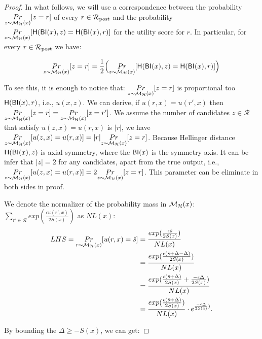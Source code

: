 \documentclass[sigconf]{acmart}
\begin{document}
\begin{proof}

In what follows, we will use a correspondence between the probability
 $\underset{z \thicksim \mathcal{M}_{\mathcal{H}}(x)}{Pr}[z = r]$ of every
 $r\in\mathcal{R}_{\textup{post}}$ and the probability 
 $\underset{z \thicksim \mathcal{M}_{\mathcal{H}}(x)}{Pr}[\mathsf{H}(\mathsf{BI}(x),z) =
 \mathsf{H}(\mathsf{BI}(x),r)]$ for the utility score for $r$. In particular, for every
 $r\in\mathcal{R}_{\textup{post}}$ we have:

$$
\underset{z \thicksim \mathcal{M}_{\mathcal{H}}(x)}{Pr}[z = r]=
\frac{1}{2}\Big (\underset{z \thicksim \mathcal{M}_{\mathcal{H}}(x)}{Pr}[\mathsf{H}(\mathsf{BI}(x),z) =
 \mathsf{H}(\mathsf{BI}(x),r)]\Big )
$$

To see this, it is enough to notice that: $\underset{z \thicksim \mathcal{M}_{\mathcal{H}}(x)}{Pr}[z = r]$ is proportional too $\mathsf{H}(\mathsf{BI}(x),r)$, i.e., $u(x,z)$. We can derive, if $u(r,x) = u(r',x)$ then $\underset{z \thicksim \mathcal{M}_{\mathcal{H}}(x)}{Pr}[z = r] = \underset{z \thicksim \mathcal{M}_{\mathcal{H}}(x)}{Pr}[z = r']$. We assume the number of candidates $z \in \mathcal{R}$ that satisfy $u(z,x) = u(r,x)$ is $|r|$, we have  $\underset{z \thicksim \mathcal{M}_{\mathcal{H}}(x)}{Pr}[u(z,x) = u(r,x)] = |r| \underset{z \thicksim \mathcal{M}_{\mathcal{H}}(x)}{Pr}[z = r]$. Because Hellinger distance  $\mathsf{H}(\mathsf{BI}(x),z)$ is axial symmetry, where the $\mathsf{BI}(x)$ is the symmetry axis. It can be infer that $|z| = 2$ for any candidates, apart from the true output, i.e., $\underset{z \thicksim \mathcal{M}_{\mathcal{H}}(x)}{Pr}[u(z,x) = u(r,x)] = 2 \underset{z \thicksim \mathcal{M}_{\mathcal{H}}(x)}{Pr}[z = r]$. This parameter can be eliminate in both sides in proof.

We denote the normalizer of the probability mass in $\mathcal{M}_{\mathcal{H}}(x)$: $\sum_{r' \in \mathcal{R}}exp(\frac{\epsilon u(r',x)}{2 S(x)})$ as $NL(x)$:
\begin{equation*}
\begin{split}
LHS 
  = \underset{r \thicksim \mathcal{M}_{\mathcal{H}}(x)}{Pr}[u(r,x) = \hat{s}]
& = \frac{exp(\frac{\epsilon \hat{s}}{2 S(x)})}{NL(x)}\\
& = \frac{exp(\frac{\epsilon (\hat{s} + \Delta - \Delta)}{2 S(x)})}{NL(x)}\\
& = \frac{exp(\frac{\epsilon (\hat{s} + \Delta)}{2 S(x)} + \frac{- \epsilon \Delta}{2 S(x)})}{NL(x)}\\
& = \frac{exp(\frac{\epsilon (\hat{s} + \Delta)}{2 S(x)})}{NL(x)} \cdot e^{\frac{- \epsilon \Delta}{2 S(x)})}.\\
\end{split}
\end{equation*}

By bounding the $\Delta \geq -S(x)$, we can get:


\end{proof}
\end{document}
